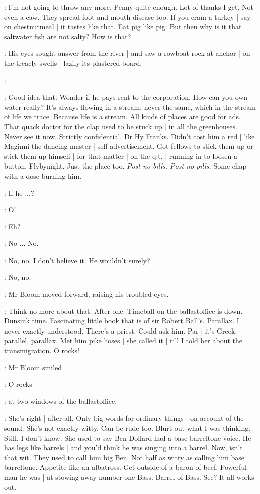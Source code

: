 \BloomInt:
I'm not going to throw any more.
Penny quite enough.
Lot of thanks I get.
Not even a caw.
They spread foot and mouth disease too.
If you cram a turkey |
say on chestnutmeal |
it tastes like that.
Eat pig like pig.
But then why is it that saltwater fish are not salty?
How is that?

:
His eyes sought answer from the river |
and saw a rowboat rock at anchor |
on the treacly swells |
lazily its plastered board.

:


\BloomInt:
Good idea that.
Wonder if he pays rent to the corporation.
How can you own water really?
It's always flowing in a stream,
never the same,
which in the stream of life we trace.
Because life is a stream.
All kinds of places are good for ads.
That quack doctor for the clap used to be stuck up |
in all the greenhouses.
Never see it now.
Strictly confidential.
Dr Hy Franks.
Didn't cost him a red |
like Maginni the dancing master |
self advertisement.
Got fellows to stick them up
or stick them up himself |
for that matter |
on the q.t. |
running in to loosen a button.
Flybynight.
Just the place too.
\emph{Post no bills.
Post no pills.}
Some chap with a dose burning him.

\BloomInt:
If he ...?

\BloomInt:
O!

\BloomInt:
Eh?

\BloomInt:
No ...
No.

\BloomInt:
No, no.
I don't believe it.
He wouldn't surely?

\BloomInt:
No, no.

:
Mr Bloom moved forward, raising his troubled eyes.

\BloomInt:
Think no more about that.
After one.
Timeball on the ballast\-office is down.
Dunsink time.
Fascinating little book that is of sir Robert Ball's.
Parallax.
I never exactly understood.
There's a priest.
Could ask him.
Par | it's Greek:
parallel, parallax.
Met him pike hoses |
she called it |
till I told her about the transmigration.
O rocks!

:
Mr Bloom smiled

\BloomInt:
O rocks

:
at two windows of the ballast\-office.

\BloomInt:
She's right |
after all.
Only big words for ordinary things |
on account of the sound.
She's not exactly witty.
Can be rude too.
Blurt out what I was thinking.
Still, I don't know.
She used to say Ben Dollard had a base barreltone voice.
He has legs like barrels |
and you'd think he was singing into a barrel.
Now, isn't that wit.
They used to call him big Ben.
Not half as witty as calling him base barreltone.
Appetite like an albatross.
Get outside of a baron of beef.
Powerful man he was |
at stowing away number one Bass.
Barrel of Bass.
See?
It all works out.

